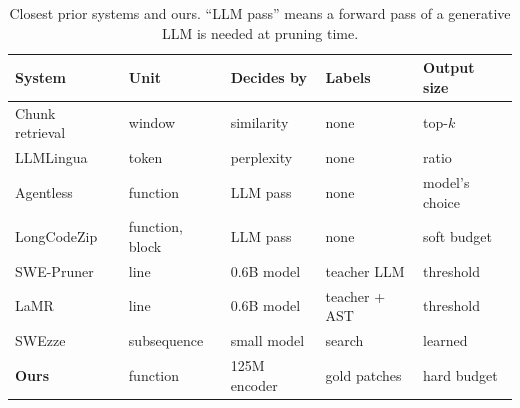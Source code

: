 \begin{table}[t]
\caption{Closest prior systems and ours. ``LLM pass'' means a forward pass of a generative LLM is needed at pruning time.}
\label{tab:related}
\centering
\scriptsize
\setlength{\tabcolsep}{3pt}
\begin{tabular}{@{}lllll@{}}
\toprule
System & Unit & Decides by & Labels & Output size \\
\midrule
Chunk retrieval~\cite{repocoder} & window & similarity & none & top-$k$ \\
LLMLingua~\cite{llmlingua} & token & perplexity & none & ratio \\
Agentless~\cite{agentless} & function & LLM pass & none & model's choice \\
LongCodeZip~\cite{longcodezip} & function, block & LLM pass & none & soft budget \\
SWE-Pruner~\cite{swepruner} & line & 0.6B model & teacher LLM & threshold \\
LaMR~\cite{lamr} & line & 0.6B model & teacher + AST & threshold \\
SWEzze~\cite{swezze} & subsequence & small model & search & learned \\
\textbf{Ours} & function & 125M encoder & gold patches & hard budget \\
\bottomrule
\end{tabular}
\end{table}
